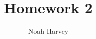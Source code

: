 \documentclass[a4paper,titlepage]{article}
\begin{document}
	\title{Homework 2}
	\author{Noah Harvey}
	\maketitle

	
\end{document}

